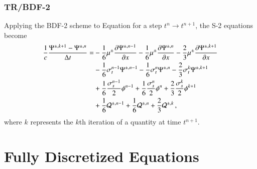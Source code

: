 \documentclass[preprint,12pt]{elsarticle}
\begin{document}
\subsubsection{TR/BDF-2}
Applying the BDF-2 scheme to Equation  for a step
$t^{n}\rightarrow t^{n+1}$, the S-2 equations become
\begin{equation}\lequ{S2BDF2}\begin{split}
  \frac{1}{c}\frac{\Psi^{\pm,k+1}-\Psi^{\pm,n}}{\dt} = &
  -\sixth\mu^\pm\dydx{\Psi^{\pm,n-1}}
  -\sixth\mu^\pm\dydx{\Psi^{\pm,n}}
  -\frac{2}{3}\mu^\pm\dydx{\Psi^{\pm,k+1}}\\
  &-\sixth\sigma_t^{n-1}\Psi^{\pm,n-1}
   -\sixth\sigma_t^{n}  \Psi^{\pm,n}
   -\frac{2}{3}\sigma_t^k\Psi^{\pm,k+1}\\
  &+\sixth\frac{\sigma_s^{n-1}}{2}\phi^{n-1}
   +\sixth\frac{\sigma_s^{n}}{2}  \phi^{n}
   +\frac{2}{3}\frac{\sigma_s^k}{2}\phi^{k+1}\\
  &+\sixth\Q^{\pm,n-1}
   +\sixth\Q^{\pm,n}
   +\frac{2}{3}\Q^{\pm,k} \pec
\end{split}\end{equation}
where $k$ represents the $k$th iteration of a quantity at time $t^{n+1}$.

\section{Fully Discretized Equations}
\end{document}
